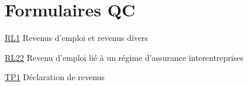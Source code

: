 \chapter*{Formulaires QC}

\href{https://www.revenuquebec.ca/fr/services-en-ligne/formulaires-et-publications/details-courant/rl-1/}{RL1}
Revenus d'emploi et revenus divers

\href{https://www.revenuquebec.ca/fr/services-en-ligne/formulaires-et-publications/details-courant/rl-22/}{RL22}
Revenu d'emploi lié à un régime d'assurance interentreprises

\href{https://www.revenuquebec.ca/fr/services-en-ligne/formulaires-et-publications/details-courant/tp-1/}{TP1}
Déclaration de revenus